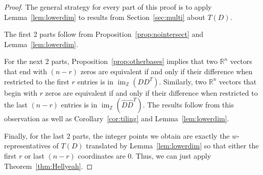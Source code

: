 \documentclass[ALCO,ThmDefs,Unicode,epreuves]{cedram}
\newcommand{\R}{\mathbb{R}}
\newcommand{\Z}{\mathbb{Z}}
\DeclareMathOperator{\Ima}{im}
\begin{document}
\begin{proof}
The general strategy for every part of this proof is to apply Lemma~\ref{lem:lowerdim} to results from Section~\ref{sec:multi} about $T(D)$. 

The first 2 parts follow from Proposition~\ref{prop:nointersect} and Lemma~\ref{lem:lowerdim}. 

For the next 2 parts, Proposition~\ref{prop:otherbases} implies that two $\R^{n}$ vectors that end with $(n-r)$ zeros are equivalent if and only if their difference when restricted to the first $r$ entries is in $\Ima_\Z(D D^T)$. Similarly, two $\R^{n}$ vectors that begin with $r$ zeros are equivalent if and only if their difference when restricted to the last $(n-r)$ entries is in $\Ima_\Z(\widehat D \widehat D^T)$. The results follow from this observation as well as Corollary~\ref{cor:tiling} and Lemma~\ref{lem:lowerdim}. 

Finally, for the last 2 parts, the integer points we obtain are exactly the $w$-representatives of $T(D)$ translated by Lemma~\ref{lem:lowerdim} so that either the first $r$ or last $(n-r)$ coordinates are 0. Thus, we can just apply Theorem~\ref{thm:Hellyeah}.
\end{proof}
\end{document}
